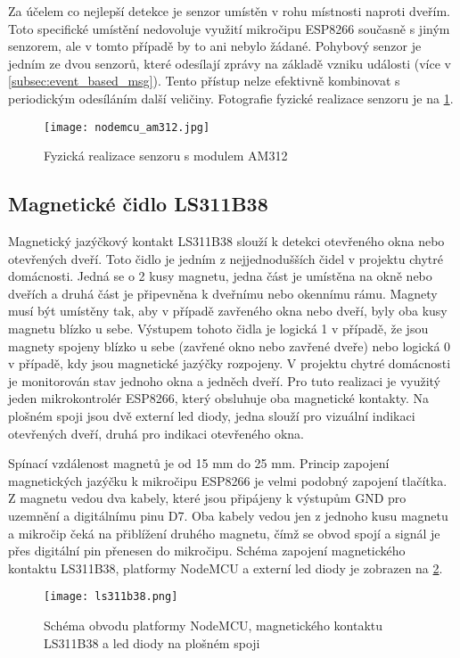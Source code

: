 Za účelem co nejlepší detekce je senzor umístěn v rohu místnosti naproti dveřím. Toto specifické umístění nedovoluje využití mikročipu ESP8266 současně s jiným senzorem, ale v tomto případě by to ani nebylo žádané. Pohybový senzor je jedním ze dvou senzorů, které odesílají zprávy na základě vzniku události (více v \cref{subsec:event_based_msg}). Tento přístup nelze efektivně kombinovat s periodickým odesíláním další veličiny. Fotografie fyzické realizace senzoru je na \cref{fig:nodemcu_am312}.

\begin{figure}[H]
  \centering
  \texttt{[image: nodemcu\_am312.jpg]}
  \caption{Fyzická realizace senzoru s modulem AM312}
  \label{fig:nodemcu_am312}
\end{figure} 

\subsection{Magnetické čidlo LS311B38}
Magnetický jazýčkový kontakt LS311B38 slouží k detekci otevřeného okna nebo otevřených dveří. Toto čidlo je jedním z nejjednodušších čidel v projektu chytré domácnosti. Jedná se o 2 kusy magnetu, jedna část je umístěna na okně nebo dveřích a druhá část je připevněna k dveřnímu nebo okennímu rámu. Magnety musí být umístěny tak, aby v případě zavřeného okna nebo dveří, byly oba kusy magnetu blízko u sebe. Výstupem tohoto čidla je logická 1 v případě, že jsou magnety spojeny blízko u sebe (zavřené okno nebo zavřené dveře) nebo logická 0 v případě, kdy jsou magnetické jazýčky rozpojeny. V projektu chytré domácnosti je monitorován stav jednoho okna a jedněch dveří. Pro tuto realizaci je využitý jeden mikrokontrolér ESP8266, který obsluhuje oba magnetické kontakty. Na plošném spoji jsou dvě externí led diody, jedna slouží pro vizuální indikaci otevřených dveří, druhá pro indikaci otevřeného okna. \par
Spínací vzdálenost magnetů je od 15 mm do 25 mm. Princip zapojení magnetických jazýčku k mikročipu ESP8266 je velmi podobný zapojení tlačítka. Z magnetu vedou dva kabely, které jsou připájeny k výstupům GND pro uzemnění a digitálnímu pinu D7. Oba kabely vedou jen z jednoho kusu magnetu a mikročip čeká na přiblížení druhého magnetu, čímž se obvod spojí a signál je přes digitální pin přenesen do mikročipu. Schéma zapojení magnetického kontaktu LS311B38, platformy NodeMCU a externí led diody je zobrazen na \cref{fig:schema_esp_ls311b38}.

\begin{figure}[H]
  \centering
  \texttt{[image: ls311b38.png]}
  \caption{Schéma obvodu platformy NodeMCU, magnetického kontaktu LS311B38 a led diody na plošném spoji}
  \label{fig:schema_esp_ls311b38}
\end{figure}

